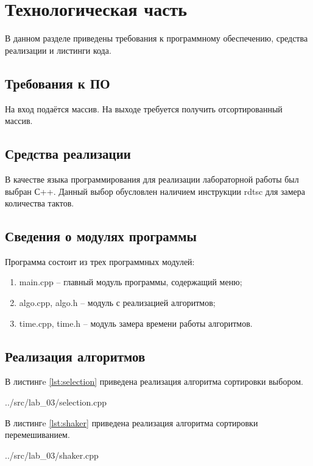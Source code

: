 \section{Технологическая часть}
В данном разделе приведены требования к программному обеспечению, средства реализации и листинги кода.

\subsection{Требования к ПО}
На вход подаётся массив.
На выходе требуется получить отсортированный массив.

\subsection{Средства реализации}

В качестве языка программирования для реализации лабораторной работы был выбран С++.
Данный выбор обусловлен наличием инструкции rdtsc \cite{microsoft_rdtsc} для замера количества тактов.

\subsection{Сведения о модулях программы}
Программа состоит из трех программных модулей:
\begin{enumerate}[label={\arabic*)}]
	\item main.cpp -- главный модуль программы, содержащий меню;
	\item algo.cpp, algo.h -- модуль с реализацией алгоритмов;
	\item time.cpp, time.h -- модуль замера времени работы алгоритмов.
\end{enumerate}

\subsection{Реализация алгоритмов}

В листингe \ref{lst:selection} приведена реализация алгоритма сортировки выбором.

\begin{lstinputlisting}[
	label={lst:selection},
	caption={Сортировка выбором},
	]{../src/lab_03/selection.cpp}
\end{lstinputlisting}

\newpage
В листингe \ref{lst:shaker} приведена реализация алгоритма сортировки перемешиванием.

\begin{lstinputlisting}[
	label={lst:shaker},
	caption={Сортировка перемешиванием},
	]{../src/lab_03/shaker.cpp}
\end{lstinputlisting}

\newpage
